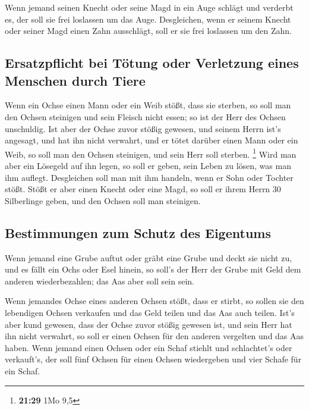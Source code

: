  Wenn jemand seinen Knecht oder seine Magd in ein Auge
schlägt und verderbt es, der soll sie frei loslassen um das Auge.
 Desgleichen, wenn er seinem Knecht oder seiner Magd
einen Zahn ausschlägt, soll er sie frei loslassen um den Zahn.

\hypertarget{ersatzpflicht-bei-tuxf6tung-oder-verletzung-eines-menschen-durch-tiere}{%
\subsection{Ersatzpflicht bei Tötung oder Verletzung eines Menschen
durch
Tiere}\label{ersatzpflicht-bei-tuxf6tung-oder-verletzung-eines-menschen-durch-tiere}}

 Wenn ein Ochse einen Mann oder ein Weib stößt, dass sie
sterben, so soll man den Ochsen steinigen und sein Fleisch nicht essen;
so ist der Herr des Ochsen unschuldig.  Ist aber der
Ochse zuvor stößig gewesen, und seinem Herrn ist's angesagt, und hat ihn
nicht verwahrt, und er tötet darüber einen Mann oder ein Weib, so soll
man den Ochsen steinigen, und sein Herr soll sterben. \footnote{\textbf{21:29}
  1Mo 9,5}  Wird man aber ein Lösegeld auf ihn legen, so
soll er geben, sein Leben zu lösen, was man ihm auflegt. 
Desgleichen soll man mit ihm handeln, wenn er Sohn oder Tochter stößt.
 Stößt er aber einen Knecht oder eine Magd, so soll er
ihrem Herrn 30 Silberlinge geben, und den Ochsen soll man steinigen.

\hypertarget{bestimmungen-zum-schutz-des-eigentums}{%
\subsection{Bestimmungen zum Schutz des
Eigentums}\label{bestimmungen-zum-schutz-des-eigentums}}

 Wenn jemand eine Grube auftut oder gräbt eine Grube und
deckt sie nicht zu, und es fällt ein Ochs oder Esel hinein,
 so soll's der Herr der Grube mit Geld dem anderen
wiederbezahlen; das Aas aber soll sein sein.

 Wenn jemandes Ochse eines anderen Ochsen stößt, dass er
stirbt, so sollen sie den lebendigen Ochsen verkaufen und das Geld
teilen und das Aas auch teilen.  Ist's aber kund gewesen,
dass der Ochse zuvor stößig gewesen ist, und sein Herr hat ihn nicht
verwahrt, so soll er einen Ochsen für den anderen vergelten und das Aas
haben.  Wenn jemand einen Ochsen oder ein Schaf stiehlt
und schlachtet's oder verkauft's, der soll fünf Ochsen für einen Ochsen
wiedergeben und vier Schafe für ein Schaf.

